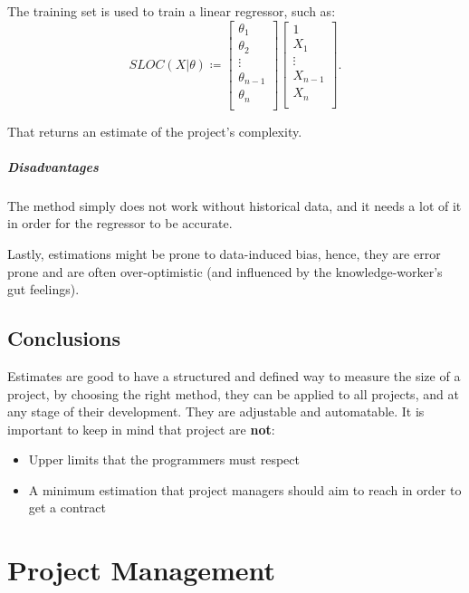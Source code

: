 \documentclass[openright, twoside, twocolumn, a4paper, 10pt]{report}
\begin{document}
The training set is used to train a linear regressor, such as:
\[
	SLOC(X|\theta) \coloneqq \begin{bmatrix}
		\theta_1     \\
		\theta_2     \\
		\vdots       \\
		\theta_{n-1} \\
		\theta_n     \\
	\end{bmatrix} \begin{bmatrix}
		1       \\
		X_1     \\
		\vdots  \\
		X_{n-1} \\
		X_n     \\
	\end{bmatrix}
	.\]

That returns an estimate of the project's complexity.

\paragraph{Disadvantages}
The method simply does not work without historical data, and it needs a lot
of it in order for the regressor to be accurate.

Lastly, estimations might be prone to data-induced bias, hence, they are
error prone and are often over-optimistic (and influenced by the knowledge-worker's
gut feelings).


\section{Conclusions}
Estimates are good to have a structured and defined way to measure the size of a project,
by choosing the right method, they can be applied to all projects, and at any stage
of their development. They are adjustable and automatable. It is important to keep
in mind that project are \textbf{not}:

\begin{itemize}
	\item Upper limits that the programmers must respect
	\item A minimum estimation that project managers should aim to reach in order to
	      get a contract
\end{itemize}


\chapter{Project Management}
\end{document}
